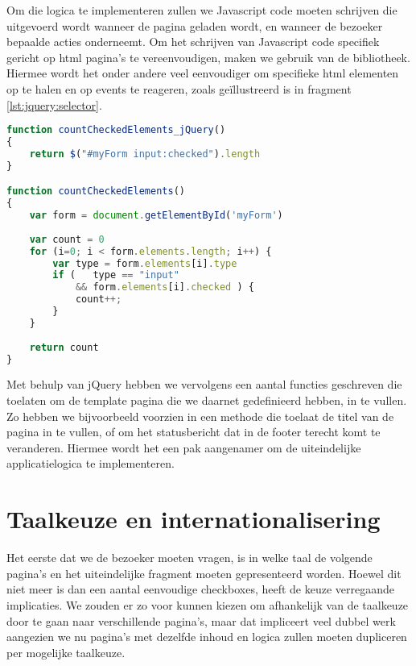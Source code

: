 Om die logica te implementeren zullen we Javascript code moeten schrijven die uitgevoerd wordt wanneer de pagina geladen wordt, en wanneer de bezoeker bepaalde acties onderneemt. Om het schrijven van Javascript code specifiek gericht op \ac{html} pagina's te vereenvoudigen, maken we gebruik van de  bibliotheek. Hiermee wordt het onder andere veel eenvoudiger om specifieke \ac{html} elementen op te halen en op events te reageren, zoals geïllustreerd is in fragment \ref{lst:jquery:selector}.
\begin{lstlisting}[language=Javascript, float, caption=Ophalen van een element met en zonder hulp van JQuery., label=lst:jquery:selector]
function countCheckedElements_jQuery()
{
	return $("#myForm input:checked").length
}

function countCheckedElements()
{
	var form = document.getElementById('myForm')
	
	var count = 0
	for (i=0; i < form.elements.length; i++) {
		var type = form.elements[i].type
		if (   type == "input"
		    && form.elements[i].checked ) {
			count++;
		}
	}
	
	return count
}
\end{lstlisting}

Met behulp van jQuery hebben we vervolgens een aantal functies geschreven die toelaten om de template pagina die we daarnet gedefinieerd hebben, in te vullen. Zo hebben we bijvoorbeeld voorzien in een  methode die toelaat de titel van de pagina in te vullen, of  om het statusbericht dat in de footer terecht komt te veranderen. Hiermee wordt het een pak aangenamer om de uiteindelijke applicatielogica te implementeren.

\section{Taalkeuze en internationalisering}
\label{voorstellingen:metavoorstelling:taal}

Het eerste dat we de bezoeker moeten vragen, is in welke taal de volgende pagina's en het uiteindelijke fragment moeten gepresenteerd worden. Hoewel dit niet meer is dan een aantal eenvoudige checkboxes, heeft de keuze verregaande implicaties. We zouden er zo voor kunnen kiezen om afhankelijk van de taalkeuze door te gaan naar verschillende pagina's, maar dat impliceert veel dubbel werk aangezien we nu pagina's met dezelfde inhoud en logica zullen moeten dupliceren per mogelijke taalkeuze.

